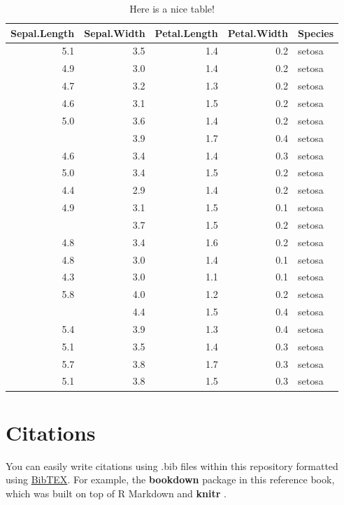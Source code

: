 \documentclass[
]{book}
\begin{document}
\begin{table}

\caption{\label{tab:nice-tab}Here is a nice table!}
\centering
\begin{tabular}[t]{rrrrl}
\toprule
Sepal.Length & Sepal.Width & Petal.Length & Petal.Width & Species\\
\midrule
5.1 & 3.5 & 1.4 & 0.2 & setosa\\
4.9 & 3.0 & 1.4 & 0.2 & setosa\\
4.7 & 3.2 & 1.3 & 0.2 & setosa\\
4.6 & 3.1 & 1.5 & 0.2 & setosa\\
5.0 & 3.6 & 1.4 & 0.2 & setosa\\
\addlinespace
5.4 & 3.9 & 1.7 & 0.4 & setosa\\
4.6 & 3.4 & 1.4 & 0.3 & setosa\\
5.0 & 3.4 & 1.5 & 0.2 & setosa\\
4.4 & 2.9 & 1.4 & 0.2 & setosa\\
4.9 & 3.1 & 1.5 & 0.1 & setosa\\
\addlinespace
5.4 & 3.7 & 1.5 & 0.2 & setosa\\
4.8 & 3.4 & 1.6 & 0.2 & setosa\\
4.8 & 3.0 & 1.4 & 0.1 & setosa\\
4.3 & 3.0 & 1.1 & 0.1 & setosa\\
5.8 & 4.0 & 1.2 & 0.2 & setosa\\
\addlinespace
5.7 & 4.4 & 1.5 & 0.4 & setosa\\
5.4 & 3.9 & 1.3 & 0.4 & setosa\\
5.1 & 3.5 & 1.4 & 0.3 & setosa\\
5.7 & 3.8 & 1.7 & 0.3 & setosa\\
5.1 & 3.8 & 1.5 & 0.3 & setosa\\
\bottomrule
\end{tabular}
\end{table}

\hypertarget{citations}{%
\section{Citations}\label{citations}}

You can easily write citations using .bib files within this repository formatted using \href{http://www.bibtex.org/}{BibTEX}. For example, the \textbf{bookdown} package \citep{R-bookdown} in this reference book, which was built on top of R Markdown and \textbf{knitr} \citep{xie2015}.
\end{document}
